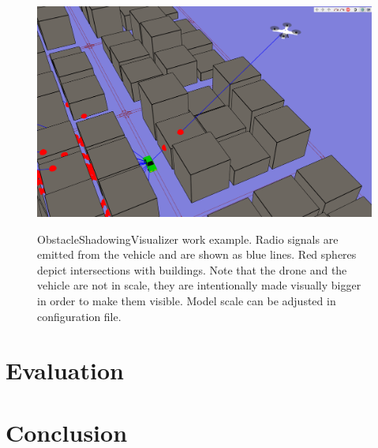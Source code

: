 \documentclass[]{nsm-thesis}
\begin{document}
\begin{itemize}
\begin{figure}
  	\caption{ObstacleShadowingVisualizer work example. Radio signals are emitted from the vehicle and are shown as blue lines. Red spheres depict intersections with buildings. Note that the drone and the vehicle are not in scale, they are intentionally made visually bigger in order to make them visible. Model scale can be adjusted in configuration file.}
	\centering
	\includegraphics[width=1\textwidth]{figures/ObstacleShadowingVisualizer.png}
	\label{fig:ObstacleShadowingVisualizer}
\end{figure}

\end{itemize}

\chapter{Evaluation}

\chapter{Conclusion}

\cleardoublepage

\listofabbreviations
\clearpage

\listoffigures
\clearpage

\listoftables
\clearpage

\printbibliography
\end{document}
